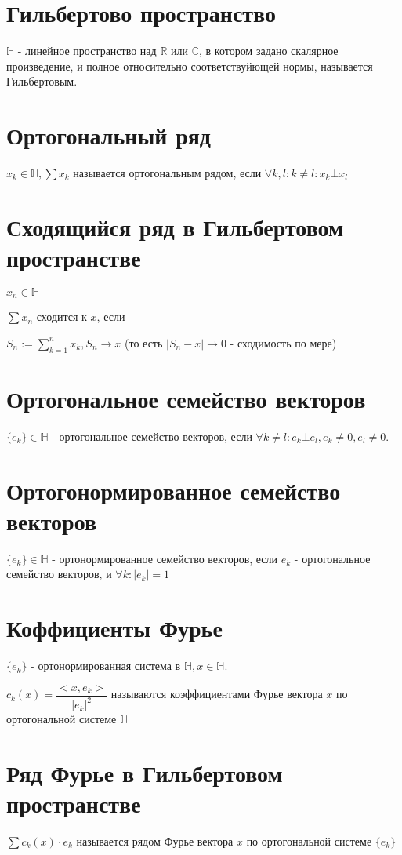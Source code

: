 \documentclass[paper=a4, fontsize=17pt]{article}
\begin{document}
\section{Гильбертово пространство}
$\mathds{H}$ - линейное пространство над $\mathds{R}$ или $\mathds{C}$, в котором задано скалярное произведение, и полное относительно соответствуйющей нормы, называется Гильбертовым.

\section{Ортогональный ряд}
$x_k \in \mathds{H}, \sum x_k$ называется ортогональным рядом, если $\forall k, l: k \neq l: x_k \bot x_l$

\section{Сходящийся ряд в Гильбертовом пространстве}
$x_n \in \mathds{H}$

$\sum x_n$ сходится к $x$, если

$S_n := \sum\limits_{k = 1}^n x_k, S_n \rightarrow x$ (то есть $|S_n - x| \rightarrow 0$ - сходимость по мере) 

\section{Ортогональное семейство векторов}
$\{e_k\} \in \mathds{H}$ - ортогональное семейство векторов, если $\forall k \neq l: e_k \bot e_l, e_k \neq 0, e_l \neq 0$.

\section{Ортогонормированное семейство векторов}
$\{e_k\} \in \mathds{H}$ - ортонормированное семейство векторов, если ${e_k}$ - ортогональное семейство векторов, и $\forall k: |e_k| = 1 $

\section{Коффициенты Фурье}
$\{e_k\}$ - ортонормированная система в $\mathds{H}, x \in \mathds{H}$.

$c_k(x) = \dfrac{<x, e_k>}{|e_k|^2}$ называются коэффициентами Фурье вектора $x$ по ортогональной системе $\mathds{H}$

\section{Ряд Фурье в Гильбертовом пространстве}

$\sum c_k(x) \cdot e_k$ называется рядом Фурье вектора $x$ по ортогональной системе $\{e_k\}$
\end{document}
